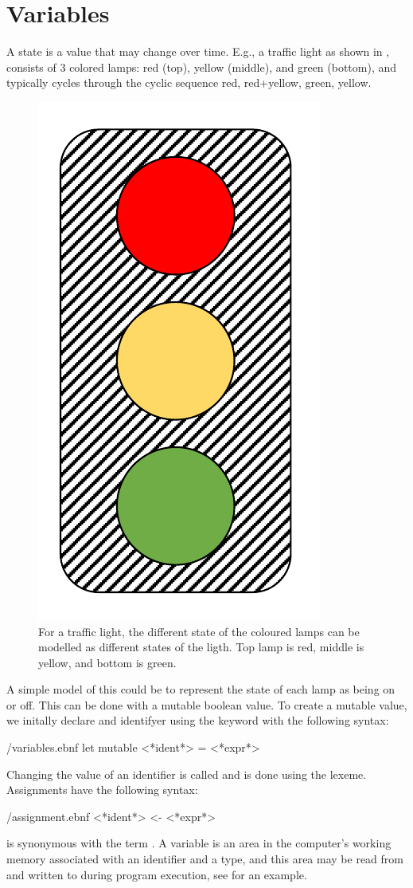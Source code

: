 \documentclass[fsharpNotes.tex]{subfiles}
\begin{document}
\section{Variables}
\label{sec:mutableValues}
A state is a value that may change over time. E.g., a traffic light as shown in , consists of 3 colored lamps: red (top), yellow (middle), and green (bottom), and typically cycles through the cyclic sequence red, red+yellow, green, yellow.
\begin{figure}
  \centering
  \includegraphics[width=0.3\linewidth]{trafficLight}
  \caption{For a traffic light, the different state of the coloured lamps can be modelled as different states of the ligth. Top lamp is red, middle is yellow, and bottom is green.}
  \label{fig:trafficLight}
\end{figure}
A simple model of this could be to represent the state of each lamp as being on or off. This can be done with a mutable boolean value. To create a mutable value, we initally declare and identifyer using the  keyword with the following syntax:
%
\begin{verbatimwrite}{\ebnf/variables.ebnf}
let mutable <*ident*> = <*expr*>
\end{verbatimwrite}
%
Changing the value of an identifier is called  and is done using the \idx[{<-}@\lstinline{<-}]{\lexeme{<-}} lexeme. Assignments have the following syntax:
%
\begin{verbatimwrite}{\ebnf/assignment.ebnf}
<*ident*> <- <*expr*>
\end{verbatimwrite}
%
 is synonymous with the term . A variable is an area in the computer's working memory associated with an identifier and a type, and this area may be read from and written to during program execution, see  for an example.
\end{document}
